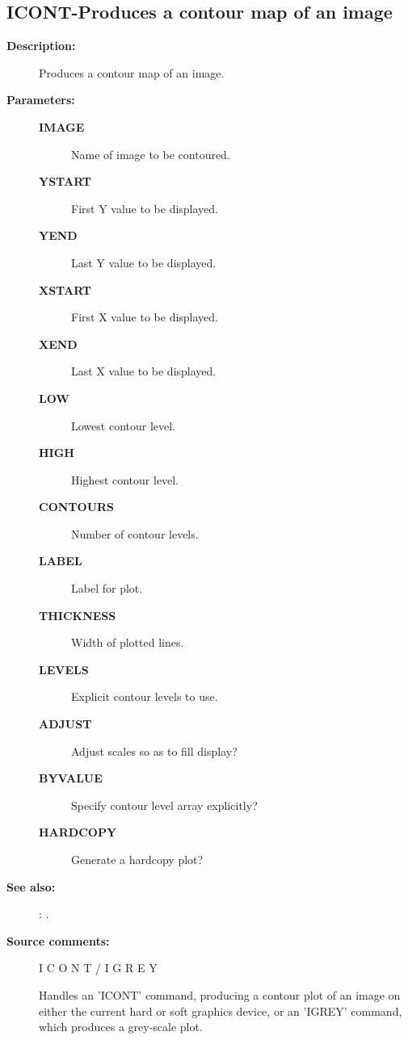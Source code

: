 \begin{description}
\subsection{ICONT-\label{ICONT}Produces a contour map of an image}
\begin{description}

\item [\textbf{Description:}]
 Produces a contour map of an image.

\item [\textbf{Parameters:}]
\begin{description}
\item [\textbf{IMAGE}]
 Name of image to be contoured.
\item [\textbf{YSTART}]
 First Y value to be displayed.
\item [\textbf{YEND}]
 Last Y value to be displayed.
\item [\textbf{XSTART}]
 First X value to be displayed.
\item [\textbf{XEND}]
 Last X value to be displayed.
\item [\textbf{LOW}]
 Lowest contour level.
\item [\textbf{HIGH}]
 Highest contour level.
\item [\textbf{CONTOURS}]
 Number of contour levels.
\item [\textbf{LABEL}]
 Label for plot.
\item [\textbf{THICKNESS}]
 Width of plotted lines.
\item [\textbf{LEVELS}]
 Explicit contour levels to use.
\item [\textbf{ADJUST}]
 Adjust scales so as to fill display?
\item [\textbf{BYVALUE}]
 Specify contour level array explicitly?
\item [\textbf{HARDCOPY}]
 Generate a hardcopy plot?
\end{description}

\item [\textbf{See also:}]
: .\\

\item [\textbf{Source comments:}]
\begin{terminalv}
 I C O N T    /    I G R E Y

 Handles an 'ICONT' command, producing a contour plot of an
 image on either the current hard or soft graphics device,
 or an 'IGREY' command, which produces a grey-scale plot.


\end{terminalv}
\end{description}
\end{description}
